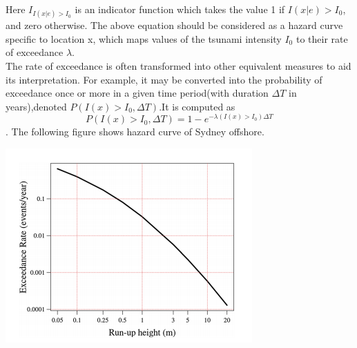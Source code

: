 \documentclass{article}
\begin{document}
\begin{itemize}
Here $I_{I(x|e)>I_{0}}$ is an indicator function which takes the value 1 if $I(x|e)>I_{0}$, and zero otherwise. The above equation should be considered as a hazard curve specific to location x, which maps values of the tsunami intensity $I_{0}$ to their rate of exceedance $\lambda$.\\

The rate of exceedance is often transformed into other equivalent measures to aid its interpretation. For example, it may be converted into the probability of exceedance once or more in a given time period(with duration $\Delta T$ in years),denoted $P(I(x)>I_{0},\Delta T)$.It is computed as 
$$P(I(x)>I_{0},\Delta T)=1-e^{-\lambda(I(x)>I_{0})\Delta T}$$. The following figure shows hazard curve of Sydney offshore.\\
\begin{center}
\includegraphics[]{exceedance.PNG}
\end{center}



\end{itemize}
\end{document}
